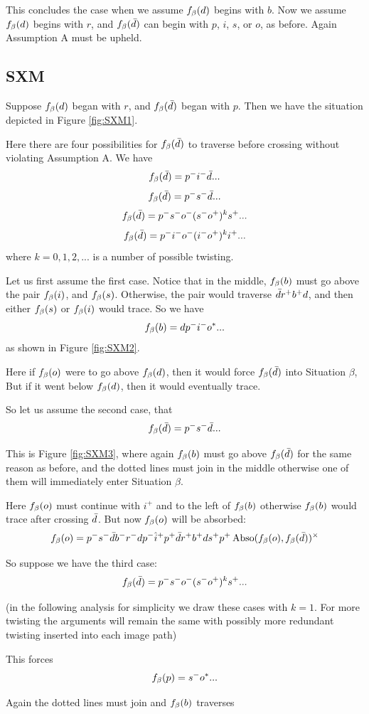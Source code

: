 This concludes the case when we assume $f_\beta(d)$ begins with $b$. Now we assume $f_\beta(d)$ begins with $r$, and $f_\beta(\bar{d})$ can begin with $p$, $i$, $s$, or $o$, as before. Again Assumption A must be upheld.

\subsection{SXM}\label{SXM}
Suppose $f_\beta(d)$ began with $r$, and $f_\beta(\bar{d})$ began with $p$. Then we have the situation depicted in Figure \ref{fig:SXM1}.

Here there are four possibilities for $f_\beta(\bar{d})$ to traverse before crossing without violating Assumption A. We have
\[
f_\beta(\bar{d}) = p^- i^- \bar{d}...
\]
\[
f_\beta(\bar{d}) = p^- s^- \bar{d}...
\]
\[
f_\beta(\bar{d}) = p^- s^- o^- (s^- o^+)^k s^+...
\]
\[
f_\beta(\bar{d}) = p^- i^- o^- (i^- o^+)^k i^+...
\]
where $k = 0,1,2,...$ is a number of possible twisting.

Let us first assume the first case. Notice that in the middle, $f_\beta(b)$ must go above the pair $f_\beta(i)$, and $f_\beta(s)$. Otherwise, the pair would traverse $\bar{d} r^+ b^+ d$, and then either $f_\beta(s)$ or $f_\beta(i)$ would trace. So we have
\[
f_\beta(b) = d p^- i^- o^*...
\]
as shown in Figure \ref{fig:SXM2}.

Here if $f_\beta(o)$ were to go above $f_\beta(d)$, then it would force $f_\beta(\bar{d})$ into Situation $\beta$, But if it went below $f_\beta(d)$, then it would eventually trace.

So let us assume the second case, that 
\[
f_\beta(\bar{d}) = p^- s^- \bar{d}...
\]

This is Figure \ref{fig:SXM3}, where again $f_\beta(b)$ must go above $f_\beta(\bar{d})$ for the same reason as before, and the dotted lines must join in the middle otherwise one of them will immediately enter Situation $\beta$.

Here $f_\beta(o)$ must continue with $i^+$ and to the left of $f_\beta(b)$ otherwise $f_\beta(b)$ would trace after crossing $\bar{d}$. But now $f_\beta(o)$ will be absorbed:
\[
f_\beta(o) = p^- s^- \bar{d} b^- r^- d p^- \hat{i}^+ p^+ \bar{d} r^+ b^+ d s^+ p^+ \operatorname{Abso}(f_\beta(o), f_\beta(\bar{d}))^\times
\]

So suppose we have the third case:
\[
f_\beta(\bar{d}) = p^- s^- o^- (s^- o^+)^k s^+...
\]

(in the following analysis for simplicity we draw these cases with $k=1$. For more twisting the arguments will remain the same with possibly more redundant twisting inserted into each image path)

This forces
\[
f_\beta(p) = s^- o^*...
\]

Again the dotted lines must join and $f_\beta(b)$ traverses

